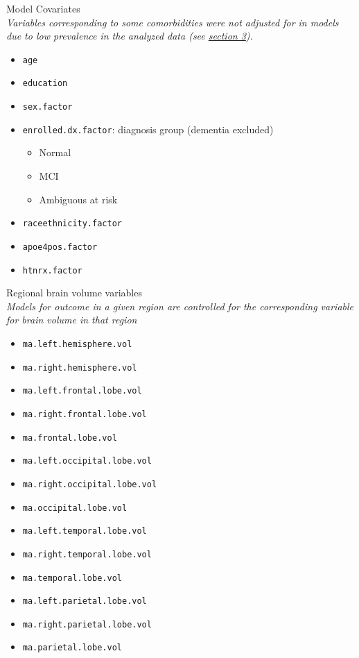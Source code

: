 \documentclass[10pt]{article}\usepackage[]{graphicx}\usepackage[]{color}
\begin{document}
Model Covariates\\
{\it Variables corresponding to some comorbidities were not adjusted for in models due to low prevalence in the analyzed data (see \hyperref[sec:table]{section 3}).}
\begin{itemize}
  \item \texttt{age}
  \item \texttt{education}
  \item \texttt{sex.factor}
  \item \texttt{enrolled.dx.factor}: diagnosis group (dementia excluded)
  \begin{itemize}
    \item Normal
    \item MCI
    \item Ambiguous at risk
  \end{itemize}
  \item \texttt{raceethnicity.factor}
  \item \texttt{apoe4pos.factor}
  \item \texttt{htnrx.factor}
\end{itemize}

Regional brain volume variables\\
{\it Models for outcome in a given region are controlled for the corresponding variable for brain volume in that region}
\begin{itemize}
  \item \texttt{ma.left.hemisphere.vol}
  \item \texttt{ma.right.hemisphere.vol}
  \item \texttt{ma.left.frontal.lobe.vol}
  \item \texttt{ma.right.frontal.lobe.vol}
  \item \texttt{ma.frontal.lobe.vol}
  \item \texttt{ma.left.occipital.lobe.vol}
  \item \texttt{ma.right.occipital.lobe.vol}
  \item \texttt{ma.occipital.lobe.vol}
  \item \texttt{ma.left.temporal.lobe.vol}
  \item \texttt{ma.right.temporal.lobe.vol}
  \item \texttt{ma.temporal.lobe.vol}
  \item \texttt{ma.left.parietal.lobe.vol}
  \item \texttt{ma.right.parietal.lobe.vol}
  \item \texttt{ma.parietal.lobe.vol}
\end{itemize}
\end{document}
